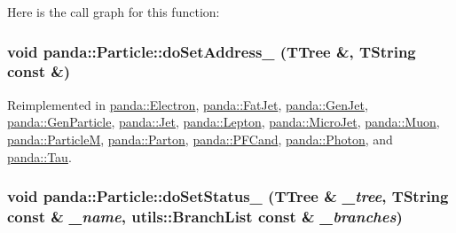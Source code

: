 Here is the call graph for this function:\hypertarget{classpanda_1_1Particle_a96e604e87ef1bc5931b4cd3da447b084}{
\subsubsection[{doSetAddress\_\-}]{\setlength{\rightskip}{0pt plus 5cm}void panda::Particle::doSetAddress\_\- (TTree \&, \/  TString const \&)}}
\label{classpanda_1_1Particle_a96e604e87ef1bc5931b4cd3da447b084}


Reimplemented in \hyperlink{classpanda_1_1Electron_a4da89a6071eab568e7aba8b61d2888a2}{panda::Electron}, \hyperlink{classpanda_1_1FatJet_a3f92ff4d7d7bb8f83fa43e4ef20bc036}{panda::FatJet}, \hyperlink{classpanda_1_1GenJet_ac0e79d0ee45b00c8477d376f81008204}{panda::GenJet}, \hyperlink{classpanda_1_1GenParticle_a05d969dcffe56d821bb1b73bdb084d6c}{panda::GenParticle}, \hyperlink{classpanda_1_1Jet_a4e59030d68ca3a27fb72f0c0976bdb27}{panda::Jet}, \hyperlink{classpanda_1_1Lepton_a2d46b07ce93bec008954f222c6860ff9}{panda::Lepton}, \hyperlink{classpanda_1_1MicroJet_a6a8758a218f0e0ce60a1af0a999ff598}{panda::MicroJet}, \hyperlink{classpanda_1_1Muon_a7488d95aaa9e9a79bda6d90b8967a52b}{panda::Muon}, \hyperlink{classpanda_1_1ParticleM_ab54d46a237f8d12074ee36c48af33b04}{panda::ParticleM}, \hyperlink{classpanda_1_1Parton_a2ab83f4fa3a99a93c7bf17ab2233a25a}{panda::Parton}, \hyperlink{classpanda_1_1PFCand_a2b6d101e2b1391e4c942b1f5ec2f6151}{panda::PFCand}, \hyperlink{classpanda_1_1Photon_a9a8788ec145f035a7a2875d5a7f9ef98}{panda::Photon}, and \hyperlink{classpanda_1_1Tau_a49f42dffab89a0699caff1da8d7993ed}{panda::Tau}.\hypertarget{classpanda_1_1Particle_aa30d821beea5e8f3d83580baf162a014}{
\subsubsection[{doSetStatus\_\-}]{\setlength{\rightskip}{0pt plus 5cm}void panda::Particle::doSetStatus\_\- (TTree \& {\em \_\-tree}, \/  TString const \& {\em \_\-name}, \/  {\bf utils::BranchList} const \& {\em \_\-branches})}}
\label{classpanda_1_1Particle_aa30d821beea5e8f3d83580baf162a014}


